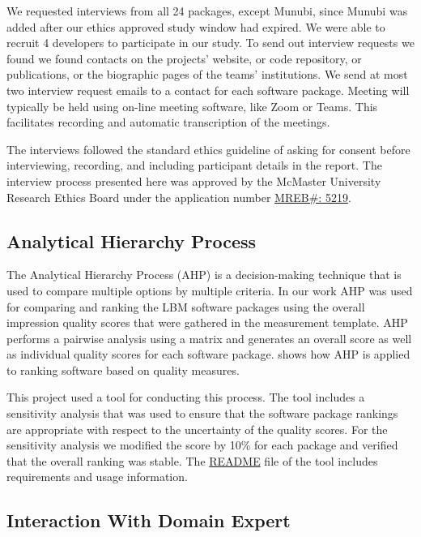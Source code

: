 \documentclass[final, 3p, times, authoryear]{elsarticle}
\begin{document}
We requested interviews from all 24 packages, except Munubi, since Munubi was
added after our ethics approved study window had expired.  We were able to
recruit 4 developers to participate in our study.  To send out interview
requests we found we found contacts on the projects' website, or code
repository, or publications, or the biographic pages of the teams'
institutions. We send at most two interview request emails to a contact for each
software package.  Meeting will typically be held using on-line meeting
software, like Zoom or Teams.  This facilitates recording and automatic
transcription of the meetings.

The interviews followed the standard ethics guideline of asking for consent
before interviewing, recording, and including participant details in the report.
The interview process presented here was approved by the McMaster University
Research Ethics Board under the application number 
\href{https://github.com/smiths/AIMSS/blob/master/StateOfPractice/MACREM/Application.pdf}
{MREB\#: 5219}.

\subsection{Analytical Hierarchy Process} \label{AHP}

The Analytical Hierarchy Process (AHP) is a decision-making technique that is
used to compare multiple options by multiple criteria. In our work AHP was used
for comparing and ranking the LBM software packages using the overall impression
quality scores that were gathered in the measurement template.  AHP performs a
pairwise analysis using a matrix and generates an overall score as well as
individual quality scores for each software package. \citep{SmithEtAl2016} shows
how AHP is applied to ranking software based on quality measures. 

This project used a tool for conducting this process. The tool includes a
sensitivity analysis that was used to ensure that the software package rankings
are appropriate with respect to the uncertainty of the quality scores. For the
sensitivity analysis we modified the score by 10\% for each package and verified
that the overall ranking was stable.  The
\href{https://github.com/smiths/AIMSS/blob/master/StateOfPractice/AHP2020/LBM/README.txt}{README}
file of the tool includes requirements and usage information.

\subsection{Interaction With Domain Expert} \label{sec_vet_software_list}
\end{document}
